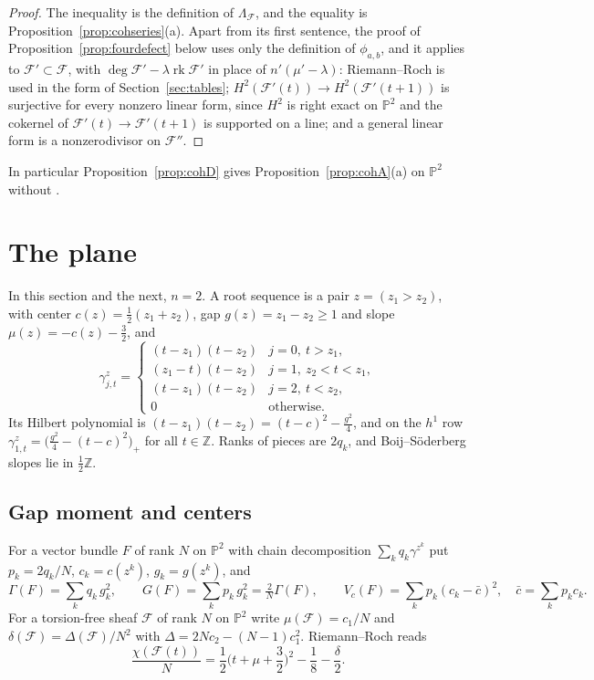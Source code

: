 \documentclass[11pt]{amsart}
\theoremstyle{definition}
\theoremstyle{remark}
\newcommand{\PP}{\mathbb{P}}
\newcommand{\ZZ}{\mathbb{Z}}
\newcommand{\cF}{\mathcal{F}}
\DeclareMathOperator{\rk}{rk}
\begin{document}
\begin{proof}
The inequality is the definition of $\Lambda_\cF$, and the equality is Proposition~\ref{prop:cohseries}(a). Apart from its first sentence, the proof of Proposition~\ref{prop:fourdefect} below uses only the definition of $\phi_{a,b}$, and it applies to $\cF'\subset\cF$, with $\deg\cF'-\lambda\rk\cF'$ in place of $n'(\mu'-\lambda)$: Riemann--Roch is used in the form of Section~\ref{sec:tables}; $H^2(\cF'(t))\to H^2(\cF'(t+1))$ is surjective for every nonzero linear form, since $H^2$ is right exact on $\PP^2$ and the cokernel of $\cF'(t)\to\cF'(t+1)$ is supported on a line; and a general linear form is a nonzerodivisor on $\cF''$.
\end{proof}

In particular Proposition~\ref{prop:cohD} gives Proposition~\ref{prop:cohA}(a) on $\PP^2$ without \cite{MiSp08}.

\section{The plane}\label{sec:plane}

In this section and the next, $n=2$. A root sequence is a pair $z=(z_1>z_2)$, with center $c(z)=\frac12(z_1+z_2)$, gap $g(z)=z_1-z_2\ge1$ and slope $\mu(z)=-c(z)-\frac32$, and
\[
\gamma^z_{j,t}=\begin{cases}(t-z_1)(t-z_2) & j=0,\ t>z_1,\\ (z_1-t)(t-z_2) & j=1,\ z_2<t<z_1,\\ (t-z_1)(t-z_2) & j=2,\ t<z_2,\\ 0 & \text{otherwise.}\end{cases}
\]
Its Hilbert polynomial is $(t-z_1)(t-z_2)=(t-c)^2-\frac{g^2}4$, and on the $h^1$ row $\gamma^z_{1,t}=\big(\frac{g^2}4-(t-c)^2\big)_+$ for all $t\in\ZZ$. Ranks of pieces are $2q_k$, and Boij--Söderberg slopes lie in $\frac12\ZZ$.

\subsection{Gap moment and centers}
For a vector bundle $F$ of rank $N$ on $\PP^2$ with chain decomposition $\sum_kq_k\gamma^{z^k}$ put $p_k=2q_k/N$, $c_k=c(z^k)$, $g_k=g(z^k)$, and
\[
\Gamma(F)=\sum_kq_k\,g_k^2,\qquad G(F)=\sum_kp_k\,g_k^2=\tfrac2N\Gamma(F),\qquad V_c(F)=\sum_kp_k(c_k-\bar c)^2,\quad\bar c=\sum_kp_kc_k .
\]
For a torsion-free sheaf $\cF$ of rank $N$ on $\PP^2$ write $\mu(\cF)=c_1/N$ and $\delta(\cF)=\Delta(\cF)/N^2$ with $\Delta=2Nc_2-(N-1)c_1^2$. Riemann--Roch reads
\begin{equation}\label{eq:RRP2}
\frac{\chi(\cF(t))}{N}=\frac12\Big(t+\mu+\frac32\Big)^2-\frac18-\frac{\delta}{2}.
\end{equation}
\end{document}

